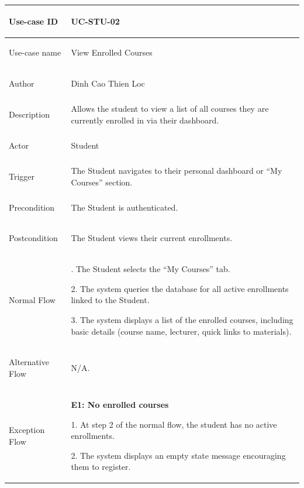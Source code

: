 {
\renewcommand{\arraystretch}{1.1}
\setlength{\tabcolsep}{8pt}
\begin{longtable}{|>{\bfseries\raggedright\arraybackslash}p{}|>{\raggedright\arraybackslash}p{}|}
\hline
Use-case ID & UC-STU-02 \\ \hline
Use-case name & View Enrolled Courses \\ \hline
Author & Dinh Cao Thien Loc \\ \hline
Description & Allows the student to view a list of all courses they are currently enrolled in via their dashboard. \\ \hline
Actor & Student \\ \hline
Trigger & The Student navigates to their personal dashboard or ``My Courses'' section. \\ \hline
Precondition & The Student is authenticated. \\ \hline
Postcondition & The Student views their current enrollments. \\ \hline
Normal Flow &
1. The Student selects the ``My Courses'' tab. \par
2. The system queries the database for all active enrollments linked to the Student. \par
3. The system displays a list of the enrolled courses, including basic details (course name, lecturer, quick links to materials). \\ \hline
Alternative Flow & N/A. \\ \hline
Exception Flow &
\textbf{E1: No enrolled courses} \par
1. At step 2 of the normal flow, the student has no active enrollments. \par
2. The system displays an empty state message encouraging them to register. \\ \hline
\end{longtable}
}

